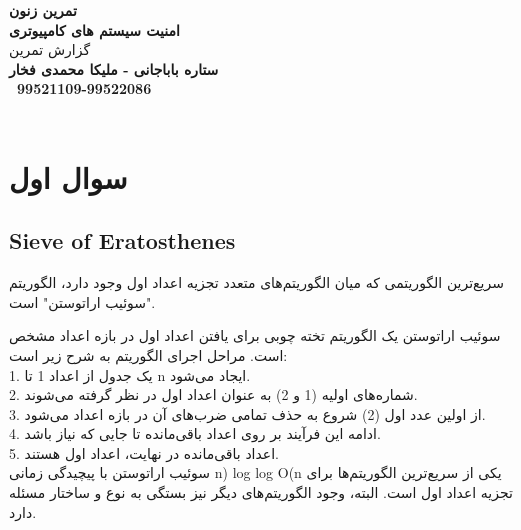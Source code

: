 \def \Subject {تمرین زنون}
\def \Course {امنیت سیستم های کامپیوتری}
\def \Author {ستاره باباجانی - ملیکا محمدی فخار}
\def \Report {گزارش تمرین}
\def \StudentNumber {99521109-99522086}

\begin{center}
\vspace{.4cm}
{\bf {\huge \Subject}}\\
\vspace{.6cm}
{\bf \Large \Course}\\
{\Large \Report} \\
\vspace{.3cm}
{\bf \Author }  \\
\vspace{.2cm}
{\bf \ \StudentNumber}\\\

\end{center}

\hspace{\fill} 



\clearpage


\section{سوال اول}
\subsection{Sieve of Eratosthenes}
  سریع‌ترین الگوریتمی که میان الگوریتم‌های متعدد تجزیه اعداد اول وجود دارد، الگوریتم "سوئیب اراتوستن" است.
  
سوئیب اراتوستن یک الگوریتم تخته چوبی برای یافتن اعداد اول در بازه اعداد مشخص است. مراحل اجرای الگوریتم به شرح زیر است:\\
1. یک جدول از اعداد 1 تا n ایجاد می‌شود.\\
2. شماره‌های اولیه (1 و 2) به عنوان اعداد اول در نظر گرفته می‌شوند.\\
3. از اولین عدد اول (2) شروع به حذف تمامی ضرب‌های آن در بازه اعداد می‌شود.\\
4. ادامه این فرآیند بر روی اعداد باقی‌مانده تا جایی که نیاز باشد.\\
5. اعداد باقی‌مانده در نهایت، اعداد اول هستند.\\

سوئیب اراتوستن با پیچیدگی زمانی n) log log O(n یکی از سریع‌ترین الگوریتم‌ها برای تجزیه اعداد اول است. البته، وجود الگوریتم‌های دیگر نیز بستگی به نوع و ساختار مسئله دارد.

